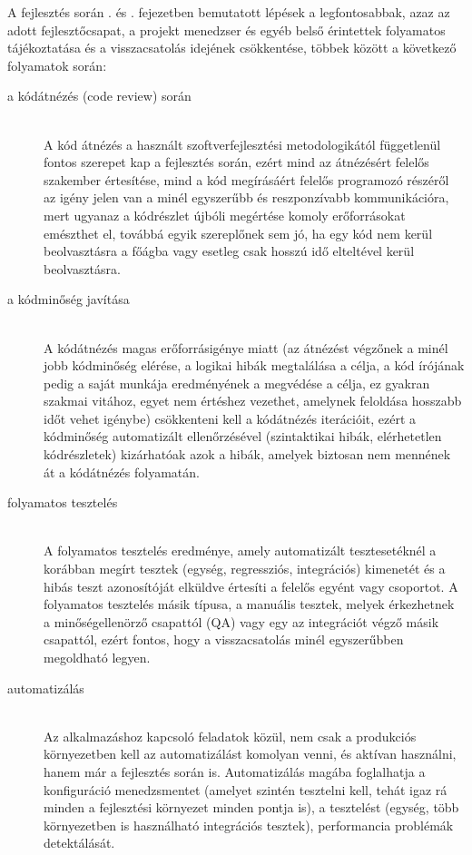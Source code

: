 A fejlesztés során . és . fejezetben bemutatott lépések a legfontosabbak, azaz az adott fejlesztőcsapat, a projekt menedzser és egyéb belső érintettek folyamatos tájékoztatása és a visszacsatolás idejének csökkentése, többek között a következő folyamatok során:
\begin{description}
  \item[a kódátnézés (code review) során]\hfill\\
  A kód átnézés a használt szoftverfejlesztési metodologikától függetlenül fontos szerepet kap a fejlesztés során, ezért mind az átnézésért felelős szakember értesítése, mind a kód megírásáért felelős programozó részéről az igény jelen van a minél egyszerűbb és reszponzívabb kommunikációra, mert ugyanaz a kódrészlet újbóli megértése komoly erőforrásokat emészthet el, továbbá egyik szereplőnek sem jó, ha egy kód nem kerül beolvasztásra a főágba vagy esetleg csak hosszú idő elteltével kerül beolvasztásra.
  \item[a kódminőség javítása]\hfill\\
  A kódátnézés magas erőforrásigénye miatt (az átnézést végzőnek a minél jobb kódminőség elérése, a logikai hibák megtalálása a célja, a kód írójának pedig a saját munkája eredményének a megvédése a célja, ez gyakran szakmai vitához, egyet nem értéshez vezethet, amelynek feloldása hosszabb időt vehet igénybe) csökkenteni kell a kódátnézés iterációit, ezért a kódminőség automatizált ellenőrzésével (szintaktikai hibák, elérhetetlen kódrészletek) kizárhatóak azok a hibák, amelyek biztosan nem mennének át a kódátnézés folyamatán.
  \item[folyamatos tesztelés]\hfill\\
  A folyamatos tesztelés eredménye, amely automatizált tesztesetéknél a korábban megírt tesztek (egység, regressziós, integrációs) kimenetét és a hibás teszt azonosítóját elküldve értesíti a felelős egyént vagy csoportot. A folyamatos tesztelés másik típusa, a manuális tesztek, melyek érkezhetnek a minőségellenörző csapattól (QA) vagy egy az integrációt végző másik csapattól, ezért fontos, hogy a visszacsatolás minél egyszerűbben megoldható legyen.
  \item[automatizálás]\hfill\\
  Az alkalmazáshoz kapcsoló feladatok közül, nem csak a produkciós környezetben kell az automatizálást komolyan venni, és aktívan használni, hanem már a fejlesztés során is. Automatizálás magába foglalhatja a konfiguráció menedzsmentet (amelyet szintén tesztelni kell, tehát igaz rá minden a fejlesztési környezet minden pontja is), a tesztelést (egység, több környezetben is használható integrációs tesztek), performancia problémák detektálását.
\end{description}

